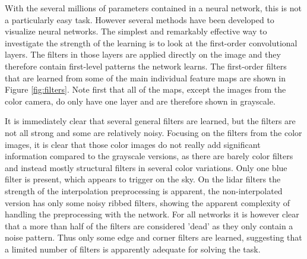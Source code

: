 With the several millions of parameters contained in a neural network, this is not a particularly easy task. However several methods have been developed to visualize neural networks. The simplest and remarkably effective way to investigate the strength of the learning is to look at the first-order convolutional layers. The filters in those layers are applied directly on the image and they therefore contain first-level patterns the network learns. The first-order filters that are learned from some of the main individual feature maps are shown in Figure \ref{fig:filters}. Note first that all of the maps, except the images from the color camera, do only have one layer and are therefore shown in grayscale. 

It is immediately clear that several general filters are learned, but the filters are not all strong and some are relatively noisy. Focusing on the filters from the color images, it is clear that those color images do not really add significant information compared to the grayscale versions, as there are barely color filters and instead mostly structural filters in several color variations. Only one blue filter is present, which appears to trigger on the sky. On the lidar filters the strength of the interpolation preprocessing is apparent, the non-interpolated version has only some noisy ribbed filters, showing the apparent complexity of handling the preprocessing with the network. For all networks it is however clear that a more than half of the filters are considered 'dead' as they only contain a noise pattern. Thus only some edge and corner filters are learned, suggesting that a limited number of filters is apparently adequate for solving the task.

